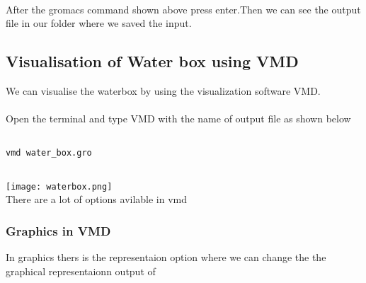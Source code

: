 \paragraph{}

After the  gromacs command shown  above press enter.Then we can see the output  file in our  folder where we saved the input.

\subsection{Visualisation of Water box  using VMD}

We can visualise the waterbox by using the visualization software VMD.

\paragraph{}

Open the terminal and type VMD with the name of output file as shown below

\begin{center}    
\begin{verbatim}

vmd water_box.gro
    
\end{verbatim}
\end{center}

\texttt{[image: waterbox.png]}\\

There are a lot of options avilable in vmd

\subsubsection{Graphics in VMD}

In graphics thers is the representaion option where we can change the the graphical representaionn output of 
